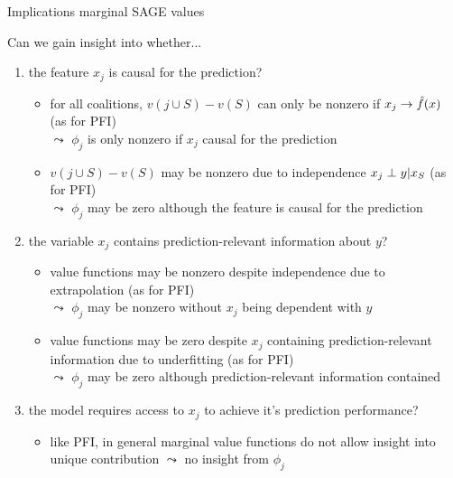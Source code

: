 \documentclass[11pt,compress,t,notes=noshow, aspectratio=169, xcolor=table]{beamer}
\begin{document}
\begin{frame}{Implications marginal SAGE values}

Can we gain insight into whether...

\begin{enumerate}
    \item<1-> the feature $x_j$ is causal for the prediction?    \begin{itemize}
      \item for all coalitions, $v(j \cup S) - v(S)$ can only be nonzero if $x_j \rightarrow \fh(x)$ (as for PFI)\\
      $\leadsto$ $\phi_j$ is only nonzero if $x_j$ causal for the prediction
      \item $v(j \cup S) - v(S)$ may be nonzero due to independence $x_j \indep y | x_S$ (as for PFI)\\
      $\leadsto$ $\phi_j$ may be zero although the feature is causal for the prediction
    \end{itemize}
    \item<2-> the variable $x_j$ contains prediction-relevant information about $y$?
    \begin{itemize}
      \item value functions may be nonzero despite independence due to extrapolation (as for PFI)\\
      $\leadsto$ $\phi_j$ may be nonzero without $x_j$ being dependent with $y$
      \item value functions may be zero despite $x_j$ containing prediction-relevant information due to underfitting (as for PFI)\\
      $\leadsto$ $\phi_j$ may be zero although prediction-relevant information contained
    \end{itemize}
    \item<3-> the model requires access to $x_j$ to achieve it's prediction performance?    
    \begin{itemize}
      \item like PFI, in general marginal value functions do not allow insight into unique contribution $\leadsto$ no insight from $\phi_j$
    \end{itemize}
\end{enumerate}

\end{frame}
%
\end{document}
